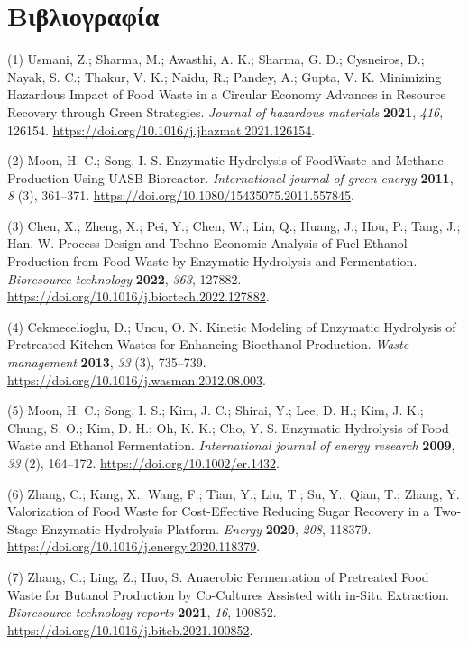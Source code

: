 \documentclass[11pt]{article}
\begin{document}
\pagebreak
\section{Βιβλιογραφία}
\label{sec:org69aaece}
\hypertarget{citeproc_bib_item_1}{(1) Usmani, Z.; Sharma, M.; Awasthi, A. K.; Sharma, G. D.; Cysneiros, D.; Nayak, S. C.; Thakur, V. K.; Naidu, R.; Pandey, A.; Gupta, V. K. Minimizing Hazardous Impact of Food Waste in a Circular Economy Advances in Resource Recovery through Green Strategies. \textit{Journal of hazardous materials} \textbf{2021}, \textit{416}, 126154. \url{https://doi.org/10.1016/j.jhazmat.2021.126154}.}

\hypertarget{citeproc_bib_item_2}{(2) Moon, H. C.; Song, I. S. Enzymatic Hydrolysis of FoodWaste and Methane Production Using UASB Bioreactor. \textit{International journal of green energy} \textbf{2011}, \textit{8} (3), 361–371. \url{https://doi.org/10.1080/15435075.2011.557845}.}

\hypertarget{citeproc_bib_item_3}{(3) Chen, X.; Zheng, X.; Pei, Y.; Chen, W.; Lin, Q.; Huang, J.; Hou, P.; Tang, J.; Han, W. Process Design and Techno-Economic Analysis of Fuel Ethanol Production from Food Waste by Enzymatic Hydrolysis and Fermentation. \textit{Bioresource technology} \textbf{2022}, \textit{363}, 127882. \url{https://doi.org/10.1016/j.biortech.2022.127882}.}

\hypertarget{citeproc_bib_item_4}{(4) Cekmecelioglu, D.; Uncu, O. N. Kinetic Modeling of Enzymatic Hydrolysis of Pretreated Kitchen Wastes for Enhancing Bioethanol Production. \textit{Waste management} \textbf{2013}, \textit{33} (3), 735–739. \url{https://doi.org/10.1016/j.wasman.2012.08.003}.}

\hypertarget{citeproc_bib_item_5}{(5) Moon, H. C.; Song, I. S.; Kim, J. C.; Shirai, Y.; Lee, D. H.; Kim, J. K.; Chung, S. O.; Kim, D. H.; Oh, K. K.; Cho, Y. S. Enzymatic Hydrolysis of Food Waste and Ethanol Fermentation. \textit{International journal of energy research} \textbf{2009}, \textit{33} (2), 164–172. \url{https://doi.org/10.1002/er.1432}.}

\hypertarget{citeproc_bib_item_6}{(6) Zhang, C.; Kang, X.; Wang, F.; Tian, Y.; Liu, T.; Su, Y.; Qian, T.; Zhang, Y. Valorization of Food Waste for Cost-Effective Reducing Sugar Recovery in a Two-Stage Enzymatic Hydrolysis Platform. \textit{Energy} \textbf{2020}, \textit{208}, 118379. \url{https://doi.org/10.1016/j.energy.2020.118379}.}

\hypertarget{citeproc_bib_item_7}{(7) Zhang, C.; Ling, Z.; Huo, S. Anaerobic Fermentation of Pretreated Food Waste for Butanol Production by Co-Cultures Assisted with in-Situ Extraction. \textit{Bioresource technology reports} \textbf{2021}, \textit{16}, 100852. \url{https://doi.org/10.1016/j.biteb.2021.100852}.}
\end{document}
